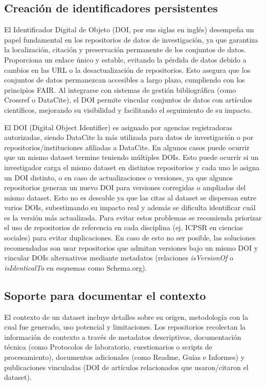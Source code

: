 \documentclass[runningheads]{llncs}
\begin{document}
\subsection*{Creación de identificadores persistentes} 

El Identificador Digital de Objeto (DOI, por sus siglas en inglés) desempeña un papel fundamental en los repositorios de datos de investigación, ya que garantiza la localización, citación y preservación permanente de los conjuntos de datos. Proporciona un enlace único y estable, evitando la pérdida de datos debido a cambios en las URL o la desactualización de repositorios. Esto asegura que los conjuntos de datos permanezcan accesibles a largo plazo, cumpliendo con los principios FAIR. Al integrarse con sistemas de gestión bibliográfica (como Crossref o DataCite), el DOI permite vincular conjuntos de datos con artículos científicos, mejorando su visibilidad y facilitando el seguimiento de su impacto.

El DOI (Digital Object Identifier) es asignado por agencias registradoras autorizadas, siendo DataCite la más utilizada para datos de investigación o por repositorios/instituciones afiliadas a DataCite. En algunos casos puede ocurrir que un mismo dataset termine teniendo múltiples DOIs. Esto puede ocurrir si un investigador carga el mismo dataset en distintos repositorios y cada uno le asigna un DOI distinto, o en caso de actualizaciones o versiones, ya que algunos repositorios generan un nuevo DOI para versiones corregidas o ampliadas del mismo dataset. Esto no es deseable ya que las citas al dataset se dispersan entre varios DOIs, subestimando su impacto real y además se dificulta identificar cuál es la versión más actualizada. Para evitar estos problemas se recomienda priorizar el uso de repositorios de referencia en cada disciplina (ej. ICPSR en ciencias sociales) para evitar duplicaciones. En caso de esto no ser posible, las soluciones recomendadas son usar repositorios que admitan versiones bajo un mismo DOI y vincular DOIs alternativos mediante metadatos (relaciones \emph{isVersionOf} o \emph{isIdenticalTo} en esquemas como Schema.org). 

\subsection*{Soporte para documentar el contexto}

El contexto de un dataset incluye detalles sobre su origen, metodología con la cual fue generado, uso potencial y limitaciones. Los repositorios recolectan la información de contexto a través de metadatos descriptivos, documentación técnica (como Protocolos de laboratorio, cuestionarios o scripts de procesamiento), documentos adicionales (como Readme, Guías e Informes) y publicaciones vinculadas (DOI de artículos relacionados que usaron/citaron el dataset). \\
\end{document}
